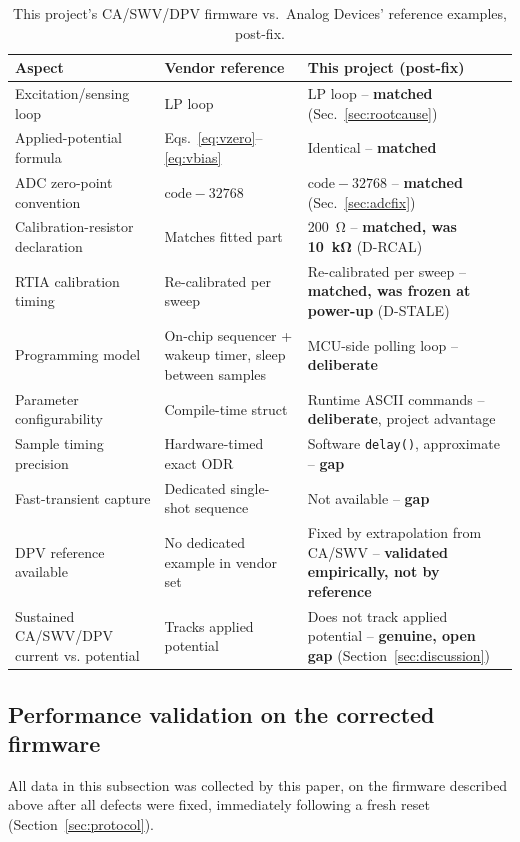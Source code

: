 \begin{table}[H]
\centering
\scriptsize
\renewcommand{\arraystretch}{0.92}
\setlength{\tabcolsep}{4pt}
\caption{This project's CA/SWV/DPV firmware vs.\ Analog Devices' reference
examples, post-fix.}
\label{tab:summary}
\begin{tabular}{@{}p{2.7cm}p{2.5cm}p{2.7cm}@{}}
\toprule
Aspect & Vendor reference & This project (post-fix) \\
\midrule
Excitation/sensing loop & LP loop & LP loop -- \textbf{matched} (Sec.~\ref{sec:rootcause}) \\
Applied-potential formula & Eqs.~\eqref{eq:vzero}--\eqref{eq:vbias} & Identical -- \textbf{matched} \\
ADC zero-point convention & $\mathrm{code}-32768$ & $\mathrm{code}-32768$ -- \textbf{matched} (Sec.~\ref{sec:adcfix}) \\
Calibration-resistor declaration & Matches fitted part & \SI{200}{\ohm} -- \textbf{matched, was \SI{10}{\kilo\ohm}} (D-RCAL) \\
RTIA calibration timing & Re-calibrated per sweep & Re-calibrated per sweep -- \textbf{matched, was frozen at power-up} (D-STALE) \\
Programming model & On-chip sequencer + wakeup timer, sleep between samples & MCU-side polling loop -- \textbf{deliberate} \\
Parameter configurability & Compile-time struct & Runtime ASCII commands -- \textbf{deliberate}, project advantage \\
Sample timing precision & Hardware-timed exact ODR & Software \texttt{delay()}, approximate -- \textbf{gap} \\
Fast-transient capture & Dedicated single-shot sequence & Not available -- \textbf{gap} \\
DPV reference available & No dedicated example in vendor set & Fixed by extrapolation from CA/SWV -- \textbf{validated empirically, not by reference} \\
Sustained CA/SWV/DPV current vs. potential & Tracks applied potential & Does not track applied potential -- \textbf{genuine, open gap} (Section~\ref{sec:discussion}) \\
\bottomrule
\end{tabular}
\end{table}

\subsection{Performance validation on the corrected firmware}
\label{sec:perfresults}
All data in this subsection was collected by this paper, on the firmware
described above after all defects were fixed, immediately following
a fresh reset (Section~\ref{sec:protocol}).

